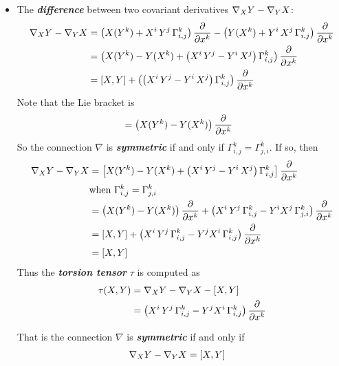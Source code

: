 \documentclass[11pt]{article}
\begin{document}
\begin{itemize}
\item The \emph{\textbf{difference}} between two covariant derivatives $\nabla_{X}{Y} - \nabla_{Y}{X}$:
\begin{align}
\nabla_{X}{Y} - \nabla_{Y}{X} &= \left(X(Y^k) + X^i\,Y^j\,\Gamma_{i,j}^{k}\right)\frac{\partial }{ \partial x^k} - \left(Y(X^k) + Y^i\,X^j\,\Gamma_{i,j}^{k}\right)\frac{\partial }{ \partial x^k} \nonumber\\
&= \left(X(Y^k) - Y(X^k) + \left( X^i\,Y^j - Y^i\,X^j\right)\Gamma_{i,j}^{k}\right)\frac{\partial }{ \partial x^k} \nonumber\\
&= [X,Y] +  \left(\left( X^i\,Y^j - Y^i\,X^j\right)\Gamma_{i,j}^{k}\right)\frac{\partial }{ \partial x^k}  \label{eqn: difference_covariant_der}
\end{align} Note that the Lie bracket is
\begin{align*}
[X, Y] &= \paren{X(Y^k) - Y(X^k)}\partdiff{}{x^k}
\end{align*} So the connection $\nabla$ is \emph{\textbf{symmetric}} if and only if $\Gamma_{i,j}^{k} = \Gamma_{j,i}^{k}$. If so, then
\begin{align*}
\nabla_{X}{Y} - \nabla_{Y}{X} &= \left[X(Y^k) - Y(X^k) + \left( X^i\,Y^j - Y^i\,X^j\right)\Gamma_{i,j}^{k}\right]\frac{\partial }{ \partial x^k} \\
&\text{when }\Gamma_{i,j}^{k} = \Gamma_{j,i}^{k}\\
&= \left(X(Y^k) - Y(X^k)\right)\frac{\partial }{ \partial x^k} + \left(X^i\,Y^j\,\Gamma_{i,j}^{k} - Y^{i}X^j\,\Gamma_{j,i}^{k}\right)\frac{\partial }{ \partial x^k}\\
&= [X, Y]  + \left(X^i\,Y^j\,\Gamma_{i,j}^{k} - Y^{j}X^i\,\Gamma_{i,j}^{k}\right)\frac{\partial }{ \partial x^k}\\
&= [X, Y]
\end{align*} Thus the \emph{\textbf{torsion tensor}} $\tau$ is computed as
\begin{align*}
\tau(X, Y) &= \nabla_{X}{Y} - \nabla_{Y}{X} - [X,Y]\\
&=  \left(X^i\,Y^j\,\Gamma_{i,j}^{k} - Y^{j}X^i\,\Gamma_{i,j}^{k}\right)\frac{\partial }{ \partial x^k}
\end{align*}

That is the connection $\nabla$ is \emph{\textbf{symmetric}} if and only if
\begin{align*}
\nabla_{X}{Y} - \nabla_{Y}{X} &= [X, Y] 
\end{align*}



\end{itemize}
\end{document}
